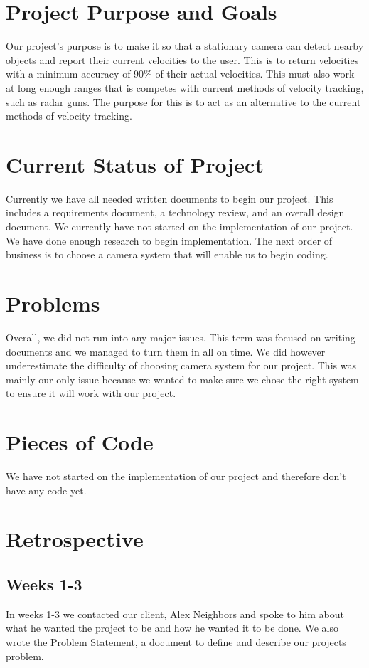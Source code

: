 \documentclass[onecolumn, draftclsnofoot,10pt, compsoc]{IEEEtran}
\begin{document}
\section{Project Purpose and Goals}
Our project's purpose is to make it so that a stationary camera can detect nearby objects and report their current velocities to the user.
This is to return velocities with a minimum accuracy of 90\% of their actual velocities.
This must also work at long enough ranges that is competes with current methods of velocity tracking, such as radar guns.
The purpose for this is to act as an alternative to the current methods of velocity tracking.


\section{Current Status of Project}
Currently we have all needed written documents to begin our project.
This includes a requirements document, a technology review, and an overall design document.
We currently have not started on the implementation of our project.
We have done enough research to begin implementation.
The next order of business is to choose a camera system that will enable us to begin coding.

\section{Problems}
Overall, we did not run into any major issues.
This term was focused on writing documents and we managed to turn them in all on time.
We did however underestimate the difficulty of choosing camera system for our project.
This was mainly our only issue because we wanted to make sure we chose the right system to ensure it will work with our project.

\section{Pieces of Code}
We have not started on the implementation of our project and therefore don't have any code yet.

\section{Retrospective}
\subsection{Weeks 1-3}
In weeks 1-3 we contacted our client, Alex Neighbors and spoke to him about what he wanted the project to be and how he wanted it to be done.
We also wrote the Problem Statement, a document to define and describe our projects problem.
\end{document}

